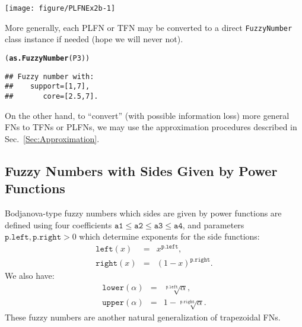 \documentclass[11pt]{article}\usepackage[]{graphicx}\usepackage[]{color}
\makeatletter
\newcommand{\hlstd}[1]{\textcolor[rgb]{0.345,0.345,0.345}{#1}}%
\newcommand{\hlkwd}[1]{\textcolor[rgb]{0.737,0.353,0.396}{\textbf{#1}}}%
\newenvironment{kframe}{%
 \def\at@end@of@kframe{}%
 \ifinner\ifhmode%
  \def\at@end@of@kframe{\end{minipage}}%
  \begin{minipage}{\columnwidth}%
 \fi\fi%
 \def\FrameCommand##1{\hskip\@totalleftmargin \hskip-\fboxsep
 \colorbox{shadecolor}{##1}\hskip-\fboxsep
     \hskip-\linewidth \hskip-\@totalleftmargin \hskip\columnwidth}%
 \MakeFramed {\advance\hsize-\width
   \@totalleftmargin\z@ \linewidth\hsize
   \@setminipage}}%
 {\par\unskip\endMakeFramed%
 \at@end@of@kframe}
\newenvironment{knitrout}{}{} %
\makeatother
\begin{document}
\begin{center}
\begin{knitrout}\small
{}\color{fgcolor}

{\centering \texttt{[image: figure/PLFNEx2b-1]} 

}



\end{knitrout}
\end{center}

\noindent
More generally, each PLFN or TFN may be converted
to a direct \texttt{FuzzyNumber} class instance if needed
(hope we will never not).

\begin{knitrout}\small
{}\color{fgcolor}\begin{kframe}
\begin{alltt}
\hlstd{(}\hlkwd{as.FuzzyNumber}\hlstd{(P3))}
\end{alltt}
\begin{verbatim}
## Fuzzy number with:
##    support=[1,7],
##       core=[2.5,7].
\end{verbatim}
\end{kframe}
\end{knitrout}

On the other hand, to ``convert'' (with possible information loss)
more general FNs to TFNs or PLFNs, we may use the approximation
procedures described in Sec.~\ref{Sec:Approximation}.



\subsection{Fuzzy Numbers with Sides Given by Power Functions}\label{Sec:powerdef}

Bodjanova-type \cite{Bodjanova2005:medianfn}
fuzzy numbers which sides are given by power functions
are defined using four coefficients
$\mathtt{a1}\le\mathtt{a2}\le\mathtt{a3}\le\mathtt{a4}$,
and parameters $\mathtt{p.left}, \mathtt{p.right}>0$ which determine
exponents for the side functions:
\begin{eqnarray}
\mathtt{left}(x)&=&x^{\mathtt{p.left}},\\
\mathtt{right}(x)&=&(1-x)^{\mathtt{p.right}}.
\end{eqnarray}
We also have:
\begin{eqnarray}
\mathtt{lower}(\alpha)&=&\sqrt[\mathtt{p.left}]{\alpha},\\
\mathtt{upper}(\alpha)&=&1-\sqrt[\mathtt{p.right}]{\alpha}.
\end{eqnarray}
These fuzzy numbers are another natural generalization of trapezoidal FNs.
\end{document}
